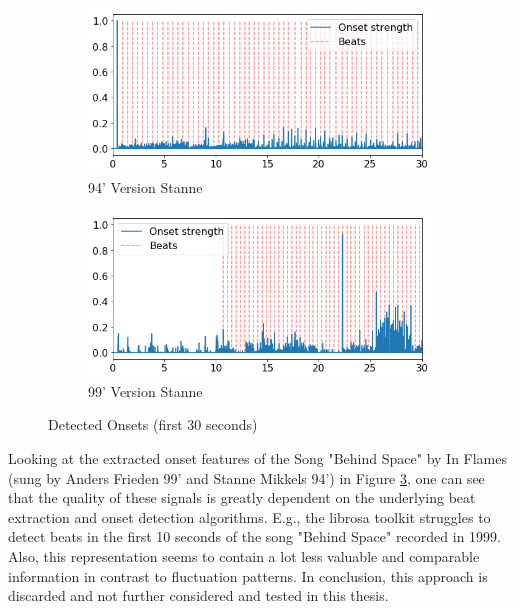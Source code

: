 \begin{figure}[htbp]
{{			\begin{subfigure}{.495\textwidth}
				\centering    
				\includegraphics[scale=0.3]{Images/Beat/s_s_on.png}
				\caption{94' Version Stanne}
				\label{saon}
			\end{subfigure}		
			\begin{subfigure}{.495\textwidth}
				\centering     
				\includegraphics[scale=0.3]{Images/Beat/s_a_on.png}
				\caption{99' Version Stanne}
				\label{sson}
			\end{subfigure}%
				
	}}
	\caption{Detected Onsets (first 30 seconds)}
	\label{fig:ons1}
\end{figure}	

\noindent Looking at the extracted onset features of the Song "Behind Space" by In Flames (sung by Anders Frieden 99' and Stanne Mikkels 94') in Figure \ref{fig:ons1}, one can see that the quality of these signals is greatly dependent on the underlying beat extraction and onset detection algorithms. E.g., the librosa toolkit struggles to detect beats in the first 10 seconds of the song "Behind Space" recorded in 1999. Also, this representation seems to contain a lot less valuable and comparable information in contrast to fluctuation patterns. In conclusion, this approach is discarded and not further considered and tested in this thesis.  

